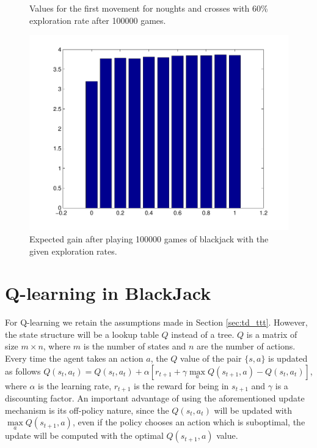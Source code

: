 \documentclass[12pt]{article}
\begin{document}
\begin{figure}[htbp!]
\begin{minipage}[t]{0.5\linewidth}
	\caption{Values for the first movement for noughts and crosses with 60\% exploration rate after 100000 games.}
	\label{fig:ttt_eps_0_6}
\end{minipage} 
\quad
\begin{minipage}[t]{0.45\linewidth}
	\includegraphics[scale=0.4]{images/blackjackExpectedGain2}
	\caption{Expected gain after playing 100000 games of blackjack with the given exploration rates.}
	\label{fig:blackjackExpectedGain}
\end{minipage}
\end{figure}

\section{Q-learning in BlackJack}

For Q-learning we retain the assumptions made in Section \ref{sec:td_ttt}.
However, the state structure will be a lookup table $Q$ instead of a tree.
$Q$ is a matrix of size $m \times n$, where $m$ is the number of states and $n$ are the number of actions.
Every time the agent takes an action $a$, the $Q$ value of the pair $\lbrace s, a \rbrace$ is updated as follows $Q(s_t,a_t) = Q(s_t,a_t) + \alpha \left[ r_{t+1} + \gamma \max\limits_a Q(s_{t+1},a) - Q(s_t,a_t) \right]$, where $\alpha$ is the learning rate, $r_{t+1}$ is the reward for being in $s_{t+1}$ and $\gamma$ is a discounting factor.
An important advantage of using the aforementioned update mechanism is its off-policy nature, since the $Q(s_t,a_t)$ will be updated with $\max\limits_a Q(s_{t+1},a)$, even if the policy chooses an action which is suboptimal, the update will be computed with the optimal $Q(s_{t+1},a)$ value.
\end{document}
